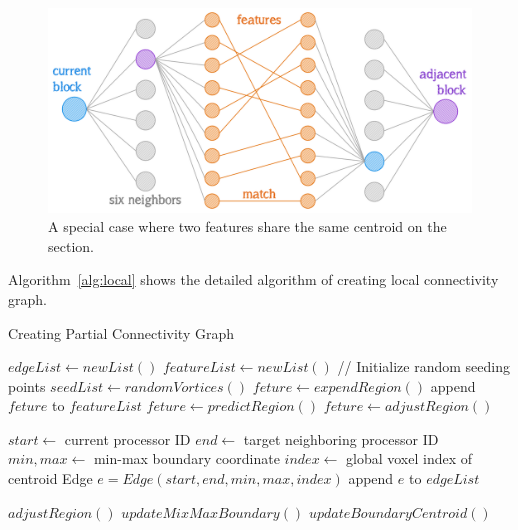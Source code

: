 \documentclass[10pt, conference, compsocconf]{IEEEtran}
\begin{document}
\begin{figure}[ht]
	\centering
	\includegraphics[width=0.9\linewidth]{match.png}
	\caption{A special case where two features share the same centroid on the section.}
	\label{fig:match}
\end{figure}

Algorithm~\ref{alg:local} shows the detailed algorithm of creating local connectivity graph.
\begin{algorithm}
\caption{Creating Partial Connectivity Graph}
\label{alg:local}
\begin{algorithmic}[1]
\STATE $edgeList \leftarrow new List()$
\STATE $featureList \leftarrow new List()$
	\STATE // Initialize random seeding points
	\STATE $seedList \leftarrow randomVortices()$
		\STATE $feture \leftarrow expendRegion()$
		\STATE append $feture$ to $featureList$
	\ENDFOR	
\ELSE
		\STATE $feture \leftarrow predictRegion()$
		\STATE $feture \leftarrow adjustRegion()$	
		
		\STATE $start \leftarrow$ current processor ID
		\STATE $end \leftarrow$ target neighboring processor ID
		\STATE $min,max \leftarrow$ min-max boundary coordinate
		\STATE $index \leftarrow$ global voxel index of centroid
		\STATE Edge $e = Edge(start, end, min, max, index)$
		\STATE append $e$ to $edgeList$
	\ENDFOR
\ENDIF
\end{algorithmic}
\begin{algorithmic} \STATE \end{algorithmic}	%
\begin{algorithmic}[1]
\STATE $adjustRegion()$
		\STATE $updateMixMaxBoundary()$
		\STATE $updateBoundaryCentroid()$
	\ENDIF
\end{algorithmic}
\end{algorithm}
\end{document}
